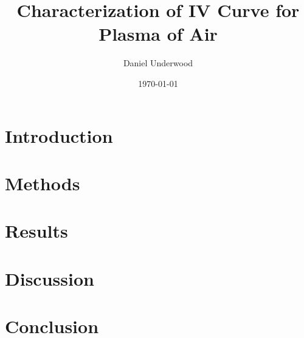 \documentclass[reprint]{revtex4-1}
\begin{document}
\title{Characterization of IV Curve for Plasma of Air}
\author{Daniel Underwood}
\date{\today}

\begin{abstract}

\end{abstract}
\maketitle

\section{Introduction}

\section{Methods}

\section{Results}

\section{Discussion}

\section{Conclusion}


\end{document}
